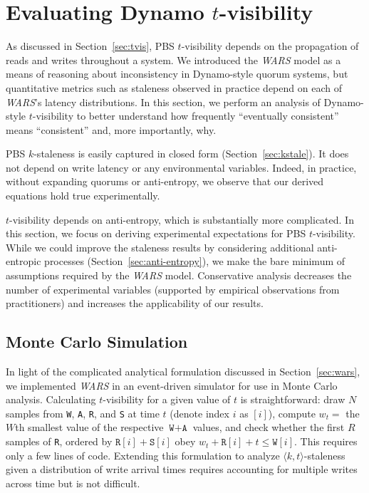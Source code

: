 \documentclass{vldb}
\newcommand{\sectionskip}{-0em}
\newcommand{\subsectionskip}{-0em}
\begin{document}
\vspace{\sectionskip}\section{Evaluating Dynamo {\large $t$}-visibility}
\label{sec:dynamoeval}

As discussed in Section~\ref{sec:tvis}, PBS $t$-visibility depends on
the propagation of reads and writes throughout a system.  We
introduced the \textit{WARS} model as a means of reasoning about
inconsistency in Dynamo-style quorum systems, but quantitative metrics
such as staleness observed in practice depend on each of
\textit{WARS}'s latency distributions.  In this section, we perform an
analysis of Dynamo-style $t$-visibility to better understand how
frequently ``eventually consistent'' means ``consistent'' and, more
importantly, why.

PBS $k$-staleness is easily captured in closed form
(Section~\ref{sec:kstale}).  It does not depend on write latency or
any environmental variables.  Indeed, in practice, without expanding
quorums or anti-entropy, we observe that our derived equations hold
true experimentally.

$t$-visibility depends on anti-entropy, which is substantially more
complicated.  In this section, we focus on deriving experimental
expectations for PBS $t$-visibility.  While we could improve the
staleness results by considering additional anti-entropic processes
(Section~\ref{sec:anti-entropy}), we make the bare minimum of
assumptions required by the \textit{WARS} model.  Conservative
analysis decreases the number of experimental variables (supported by
empirical observations from practitioners) and increases the
applicability of our results.

\vspace{\subsectionskip}\subsection{Monte Carlo Simulation}
\label{sec:mcsim}

In light of the complicated analytical formulation discussed in
Section~\ref{sec:wars}, we implemented \textit{WARS} in an
event-driven simulator for use in Monte Carlo analysis.  Calculating
$t$-visibility for a given value of $t$ is straightforward: draw $N$
samples from \texttt{W}, \texttt{A}, \texttt{R}, and \texttt{S} at
time $t$ (denote index $i$ as $[i]$), compute $w_t = $ the $W$th
smallest value of the respective $\texttt{W}+\texttt{A}$ values, and
check whether the first $R$ samples of \texttt{R}, ordered by
$\texttt{R}[i]+\texttt{S}[i]$ obey $w_t+\texttt{R}[i] + t\leq
\texttt{W}[i]$.  This requires only a few lines of code.  Extending
this formulation to analyze $\langle k, t \rangle$-staleness given a
distribution of write arrival times requires accounting for multiple
writes across time but is not difficult.
\end{document}
